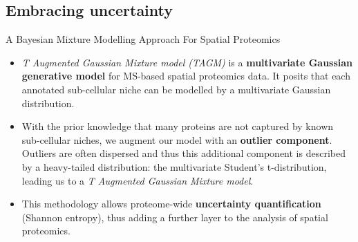 \subsection{Embracing uncertainty}

\begin{frame}{A Bayesian Mixture Modelling Approach For Spatial Proteomics}

  \begin{itemize}

    \item<+-> \textit{T Augmented Gaussian Mixture model (TAGM)} is a
      \textbf{multivariate Gaussian generative model} for MS-based
      spatial proteomics data. It posits that each annotated
      sub-cellular niche can be modelled by a multivariate Gaussian
      distribution.

    \item<+-> With the prior knowledge that many proteins are not
      captured by known sub-cellular niches, we augment our model with
      an \textbf{outlier component}. Outliers are often dispersed and
      thus this additional component is described by a heavy-tailed
      distribution: the multivariate Student's t-distribution, leading
      us to a \textit{T Augmented Gaussian Mixture model}.

    \item<+-> This methodology allows proteome-wide
      \textbf{uncertainty quantification} (Shannon entropy), thus
      adding a further layer to the analysis of spatial proteomics.

  \end{itemize}
\end{frame}

